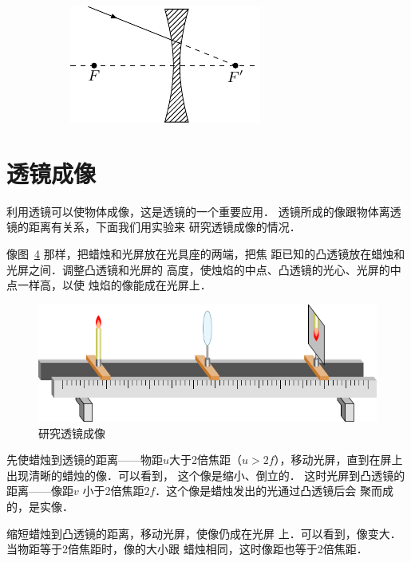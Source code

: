 \begin{figure}[htbp]
\begin{subfigure}{0.3\linewidth}
        \caption{}\label{fig_C_5-37d}
    \end{subfigure}
    \hfill
    \begin{subfigure}{0.3\linewidth}
        \centering
        \includegraphics{fig/C/5-37e.pdf}
        \caption{}\label{fig_C_5-37e}
    \end{subfigure}
    \caption{}\label{fig_C_5-37}
\end{figure}

\section{透镜成像}
利用透镜可以使物体成像，这是透镜的一个重要应用．
透镜所成的像跟物体离透镜的距离有关系，下面我们用实验来
研究透镜成像的情况．

像图~\ref{fig_C_5-38} 那样，把蜡烛和光屏放在光具座的两端，把焦
距已知的凸透镜放在蜡烛和光屏之间．调整凸透镜和光屏的
高度，使烛焰的中点、凸透镜的光心、光屏的中点一样高，以使
烛焰的像能成在光屏上．
\begin{figure}[htbp]
    \centering
    \includegraphics{fig/C/5-38.pdf}
    \caption{研究透镜成像}\label{fig_C_5-38}
\end{figure}

先使蜡烛到透镜的距离——物距$u$大于2倍焦距（$u>
2f$），移动光屏，直到在屏上出现清晰的蜡烛的像．可以看到，
这个像是缩小、倒立的．
这时光屏到凸透镜的距离——像距$v$
小于2倍焦距$2f$．这个像是蜡烛发出的光通过凸透镜后会
聚而成的，是实像．

缩短蜡烛到凸透镜的距离，移动光屏，使像仍成在光屏
上．可以看到，像变大．当物距等于2倍焦距时，像的大小跟
蜡烛相同，这时像距也等于2倍焦距．

